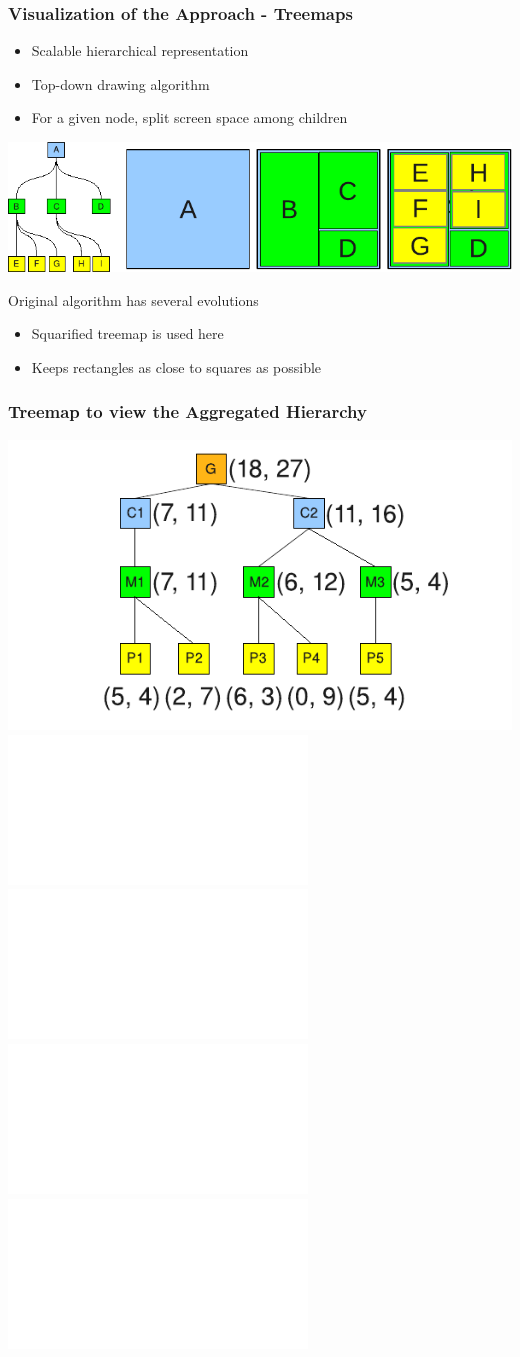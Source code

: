 \frame
{
   \frametitle{Visualization of the Approach - Treemaps}
   \begin{itemize}
      \item Scalable hierarchical representation
      \item Top-down drawing algorithm
      \item For a given node, split screen space among children
   \end{itemize}

   \vfill

   \begin{minipage}{\textwidth}
   \centering
   \includegraphics[width=\textwidth]{img/treemap-notion.pdf}
   \end{minipage}

   \vfill

   \begin{block}{Original algorithm has several evolutions}
   \begin{itemize}
      \item Squarified treemap is used here
      \item Keeps rectangles as close to squares as possible
   \end{itemize}
   \end{block}
}

\frame
{
   \frametitle{Treemap to view the Aggregated Hierarchy}

   \begin{minipage}{\textwidth}
   \centering
   \includegraphics[width=.7\textwidth]{img/agg-aggmodel-overall-4.pdf}\\
   \includegraphics<1>[width=.28\textwidth]{img/agg-aggmodel-treemap-1.pdf}
   \includegraphics<2>[width=.28\textwidth]{img/agg-aggmodel-treemap-2.pdf}
   \includegraphics<3>[width=.28\textwidth]{img/agg-aggmodel-treemap-3.pdf}
   \includegraphics<4>[width=.28\textwidth]{img/agg-aggmodel-treemap-4.pdf}
   \end{minipage}
}
